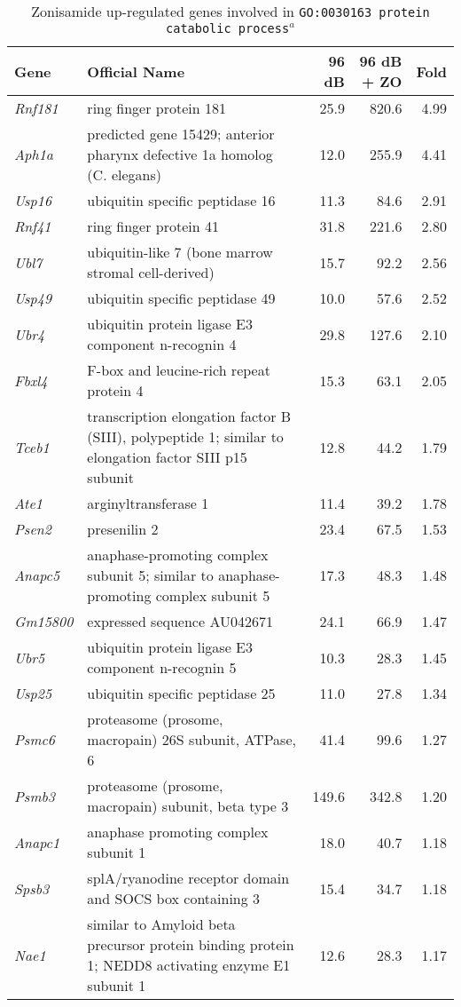 \documentclass{article}
\begin{document}
\begin{table} 
\caption{Zonisamide up-regulated genes involved in \texttt{GO:0030163~protein catabolic process}$^a$}
\begin{small}
\begin{tabular}{l p{2.5in }rrr}
  \hline
 Gene& Official Name & 96 dB & 96 dB + ZO & Fold \\ 
  \hline
{\it Rnf181}&ring finger protein 181&25.9&820.6&4.99\\
{\it Aph1a}&predicted gene 15429; anterior pharynx defective 1a homolog (C. elegans)&12.0&255.9&4.41\\
{\it Usp16}&ubiquitin specific peptidase 16&11.3&84.6&2.91\\
{\it Rnf41}&ring finger protein 41&31.8&221.6&2.80\\
{\it Ubl7}&ubiquitin-like 7 (bone marrow stromal cell-derived)&15.7&92.2&2.56\\
{\it Usp49}&ubiquitin specific peptidase 49&10.0&57.6&2.52\\
{\it Ubr4}&ubiquitin protein ligase E3 component n-recognin 4&29.8&127.6&2.10\\
{\it Fbxl4}&F-box and leucine-rich repeat protein 4&15.3&63.1&2.05\\
{\it Tceb1}&transcription elongation factor B (SIII), polypeptide 1; similar to elongation factor SIII p15 subunit&12.8&44.2&1.79\\
{\it Ate1}&arginyltransferase 1&11.4&39.2&1.78\\
{\it Psen2}&presenilin 2&23.4&67.5&1.53\\
{\it Anapc5}&anaphase-promoting complex subunit 5; similar to anaphase-promoting complex subunit 5&17.3&48.3&1.48\\
{\it Gm15800}&expressed sequence AU042671&24.1&66.9&1.47\\
{\it Ubr5}&ubiquitin protein ligase E3 component n-recognin 5&10.3&28.3&1.45\\
{\it Usp25}&ubiquitin specific peptidase 25&11.0&27.8&1.34\\
{\it Psmc6}&proteasome (prosome, macropain) 26S subunit, ATPase, 6&41.4&99.6&1.27\\
{\it Psmb3}&proteasome (prosome, macropain) subunit, beta type 3&149.6&342.8&1.20\\
{\it Anapc1}&anaphase promoting complex subunit 1&18.0&40.7&1.18\\
{\it Spsb3}&splA/ryanodine receptor domain and SOCS box containing 3&15.4&34.7&1.18\\
{\it Nae1}&similar to Amyloid beta precursor protein binding protein 1; NEDD8 activating enzyme E1 subunit 1&12.6&28.3&1.17\\

\end{tabular}
\end{small}
\end{table}
\end{document}
